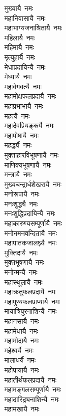 \begin{flushleft}
\begin{multicols}{2}
मुख्यायै~नमः\\
महानिवासायै~नमः\\
महाभाग्यजनाश्रितायै~नमः\\
महिलायै~नमः\\
महिमायै~नमः\\
मृत्युहार्यै~नमः\\
मेधाप्रदायिन्यै~नमः\\
मेध्यायै~नमः\hfill{}\\
महावेगवत्यै~नमः\\
महामोक्षफलप्रदायै~नमः\\
महाप्रभाभायै~नमः\\
महत्यै~नमः\\
महादेवप्रियङ्कर्यै~नमः\\
महापोषायै~नमः\\
महर्द्ध्यै~नमः\\
मुक्ताहारविभूषणायै~नमः\\
माणिक्यभूषणायै~नमः\\
मन्त्रायै~नमः\hfill{}\\
मुख्यचन्द्रार्धशेखरायै~नमः\\
मनोरूपायै~नमः\\
मनःशुद्ध्यै~नमः\\
मनःशुद्धिप्रदायिन्यै~नमः\\
महाकारुण्यसम्पूर्णायै~नमः\\
मनोनमनवन्दितायै~नमः\\
महापातकजालघ्न्यै~नमः\\
मुक्तिदायै~नमः\\
मुक्तभूषणायै~नमः\\
मनोन्मन्यै~नमः\hfill{}\\
महास्थूलायै~नमः\\
महाक्रतुफलप्रदायै~नमः\\
महापुण्यफलप्राप्यायै~नमः\\
मायात्रिपुरनाशिन्यै~नमः\\
महानसायै~नमः\\
महामेधायै~नमः\\
महामोदायै~नमः\\
महेश्वर्यै~नमः\\
मालाधर्यै~नमः\\
महोपायायै~नमः\hfill{}\\
महातीर्थफलप्रदायै~नमः\\
महामङ्गलसम्पूर्णायै~नमः\\
महादारिद्र्यनाशिन्यै~नमः\\
महामखायै~नमः\\

\end{multicols}
\end{flushleft}
